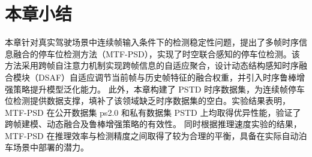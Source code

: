\section{本章小结}

本章针对真实驾驶场景中连续帧输入条件下的检测稳定性问题，提出了多帧时序信息融合的停车位检测方法（MTF-PSD），实现了时空联合感知的停车位检测。该方法采用跨帧自注意力机制实现跨帧信息的自适应聚合，设计动态结构感知时序融合模块（DSAF）自适应调节当前帧与历史帧特征的融合权重，并引入时序鲁棒增强策略提升模型泛化能力。
此外，本章构建了 PSTD 时序数据集，为连续帧停车位检测提供数据支撑，填补了该领域缺乏时序数据集的空白。实验结果表明，MTF-PSD 在公开数据集 ps2.0 和私有数据集 PSTD 上均取得优异性能，验证了跨帧建模、动态融合及鲁棒增强策略的有效性。
同时根据推理速度实验的结果，MTF-PSD 在推理效率与检测精度之间取得了较为合理的平衡，具备在实际自动泊车场景中部署的潜力。